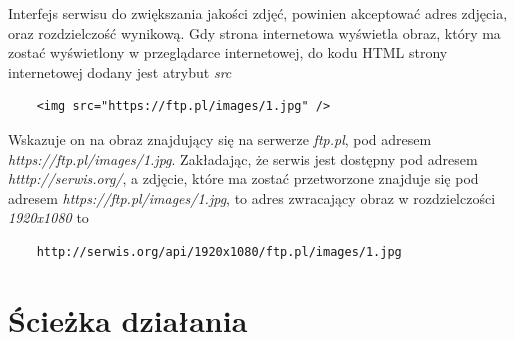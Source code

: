 Interfejs serwisu do zwiększania jakości zdjęć, powinien akceptować adres zdjęcia, oraz rozdzielczość wynikową.
\newline
Gdy strona internetowa wyświetla obraz, który ma zostać wyświetlony w przeglądarce internetowej, do kodu HTML strony internetowej dodany jest atrybut {\it src}
\newline
\begin{verbatim}
	<img src="https://ftp.pl/images/1.jpg" />
\end{verbatim}

Wskazuje on na obraz znajdujący się na serwerze \textit{ftp.pl}, pod adresem \textit{https://ftp.pl/images/1.jpg}.
\newline
Zakładając, że serwis jest dostępny pod adresem \textit{htttp://serwis.org/}, a zdjęcie, które ma zostać przetworzone znajduje się pod adresem \textit{https://ftp.pl/images/1.jpg}, to adres zwracający obraz w rozdzielczości \textit{1920x1080} to
\newline
\begin{verbatim}
	http://serwis.org/api/1920x1080/ftp.pl/images/1.jpg
\end{verbatim}

\clearpage
\section{Ścieżka działania}

